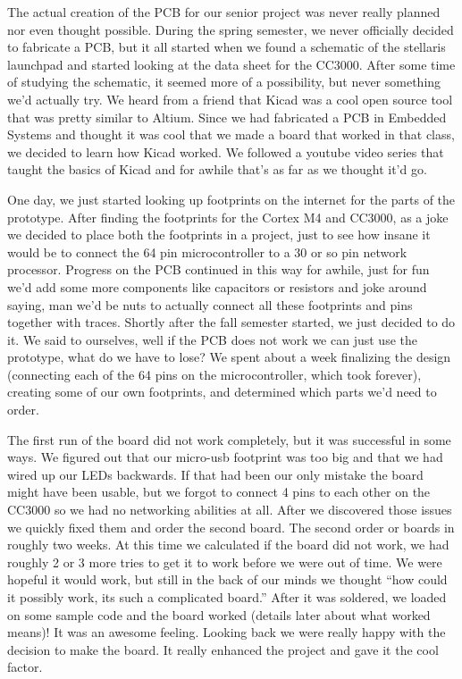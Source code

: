 \documentclass[letterpaper, 12 pt]{article}
\begin{document}
  The actual creation of the PCB for our senior project was never really planned nor even thought possible. During the spring semester, we never officially decided to fabricate a PCB, but it all started when we found a schematic of the stellaris launchpad and started looking at the data sheet for the CC3000. After some time of studying the schematic, it seemed more of a possibility, but never something we’d actually try. We heard from a friend that Kicad was a cool open source tool that was pretty similar to Altium. Since we had fabricated a PCB in Embedded Systems and thought it was cool that we made a board that worked in that class, we decided to learn how Kicad worked. We followed a youtube video series that taught the basics of Kicad and for awhile that’s as far as we thought it’d go. 

  One day, we just started looking up footprints on the internet for the parts of the prototype. After finding the footprints for the Cortex M4 and CC3000, as a joke we decided to place both the footprints in a project, just to see how insane it would be to connect the 64 pin microcontroller to a 30 or so pin network processor. Progress on the PCB continued in this way for awhile, just for fun we’d add some more components like capacitors or resistors and joke around saying, man we’d be nuts to actually connect all these footprints and pins together with traces. Shortly after the fall semester started, we just decided to do it. We said to ourselves, well if the PCB does not work we can just use the prototype, what do we have to lose? We spent about a week finalizing the design (connecting each of the 64 pins on the microcontroller, which took forever), creating some of our own footprints, and determined which parts we’d need to order. 

    The first run of the board did not work completely, but it was successful in some ways. We figured out that our micro-usb footprint was too big and that we had wired up our LEDs backwards. If that had been our only mistake the board might have been usable, but we forgot to connect 4 pins to each other on the CC3000 so we had no networking abilities at all. After we discovered those issues we quickly fixed them and order the second board. The second order or boards in roughly two weeks. At this time we calculated if the board did not work, we had roughly 2 or 3 more tries to get it to work before we were out of time. We were hopeful it would work, but still in the back of our minds we thought “how could it possibly work, its such a complicated board.” After it was soldered, we loaded on some sample code and the board worked (details later about what worked means)! It was an awesome feeling. Looking back we were really happy with the decision to make the board. It really enhanced the project and gave it the cool factor. 
      
\end{document}
